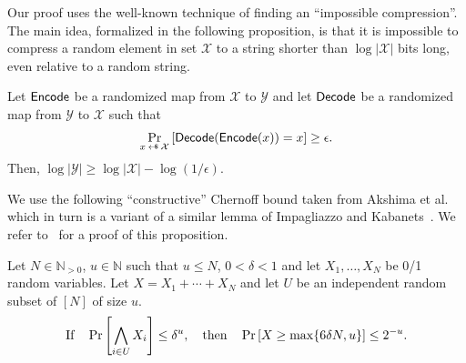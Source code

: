 Our proof uses the well-known technique of finding an ``impossible compression''. The main idea, formalized in the following proposition, is that it is impossible to compress a random element in set $\mathcal{X}$ to a string shorter than $\log |\mathcal{X}|$ bits long, even relative to a random string.
    \begin{proposition}\label{complemma}
  Let $\mathsf{Encode}$ be a randomized map from $\mathcal{X}$ to $\mathcal{Y}$ and let $\mathsf{Decode}$ be a randomized map from $\mathcal{Y}$ to $\mathcal{X}$ such that
  \begin{align*}
  \Pr_{x\getsr \mathcal{X}}\left[ \Decode(\Encode(x))=x\right]\geq \epsilon.
  \end{align*} 
  Then,
  $\log{|\mathcal{Y}|} \geq \log{|\mathcal{X}|}- \log (1/\epsilon)$. 
    \end{proposition}

\newcommand{\constructiveChernoffPrlims}{
We use the following ``constructive'' Chernoff bound taken from Akshima et al.~\cite{AkshimaCDW20} which in turn is a variant of a similar lemma of Impagliazzo and Kabanets~\cite{AR:ImpKab10}. We refer to~\cite[Section 9]{AkshimaCDW20} for a proof of this proposition.
\begin{proposition}[{\cite[Theorem 1]{AkshimaCDW20}}] \label{prop:chern}
    Let $N\in \mathbb{N}_{>0}$, $u\in \mathbb{N}$ such that $u\leq N$,  $0<\delta<1$ and let $X_1,\ldots,X_N$ be 0/1 random variables. Let $X=X_1+\cdots+X_N$ and let $U$ be an independent random subset of $[N]$ of size $u$. 
    \begin{align*}
    \text{If} \quad \Prob{\bigwedge_{i\in U} X_i}\leq \delta^u, \quad \text{then}\quad
    \Prob{X\geq \max\{6\delta N,u\}}\leq 2^{-u}.
    \end{align*}
\end{proposition}
}
\ifnum{}
\constructiveChernoffPrlims
\else
\fi


